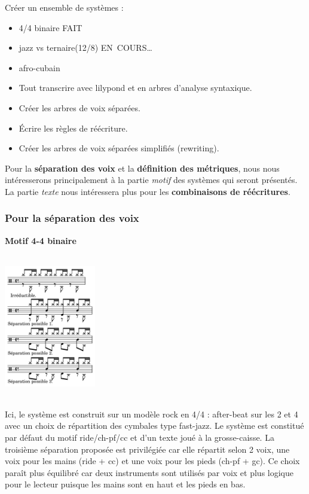 Créer un ensemble de systèmes :
\begin{itemize}
	\item 4/4 binaire FAIT
	\item jazz vs ternaire(12/8) EN COURS…
	\item afro-cubain
	\item Tout transcrire avec lilypond et en arbres d’analyse syntaxique.
	\item Créer les arbres de voix séparées.
	\item Écrire les règles de réécriture.
	\item Créer les arbres de voix séparées simplifiés (rewriting).\\	
\end{itemize}

Pour la \textbf{séparation des voix} et la \textbf{définition des métriques}, nous nous intéresserons principalement à la partie \textit{motif} des systèmes qui seront présentés. La partie \textit{texte} nous intéressera plus pour les \textbf{combinaisons de réécritures}.
\newpage
\subsubsection{Pour la séparation des voix}
\textbf{Motif 4-4 binaire}\\\\
\includegraphics[height=60mm, width=40mm]{z_images/1_description_notation/separation/1_separation_4-4_binaire.png}\\\\
Ici, le système est construit sur un modèle rock en 4/4 : after-beat sur les 2 et 4 avec un choix de répartition des cymbales type fast-jazz. Le système est constitué par défaut du motif ride/ch-pf/cc et d’un texte joué à la grosse-caisse. La troisième séparation proposée est privilégiée car elle répartit selon 2 voix, une voix pour les mains (ride + cc) et une voix pour les pieds (ch-pf + gc). Ce choix paraît plus équilibré car deux instruments sont utilisés par voix et plus logique pour le lecteur puisque les mains sont en haut et les pieds en bas.\\

